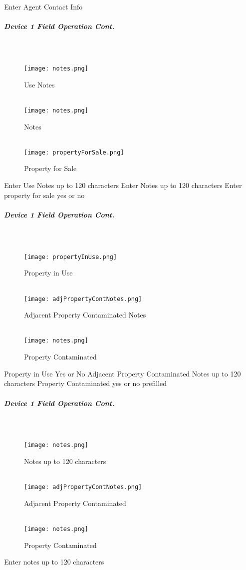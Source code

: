 \documentclass[class=article , crop=false, titlepage, twoside, multi={itemize, figure, verbatim}, float=false]{standalone}
\begin{document}
\noindent Enter Agent Contact Info
\clearpage
\subparagraph*{Device 1 Field Operation Cont.}
\subparagraph*{\\}
\begin{wrapfigure}{r}{0.5\textwidth}
\centering
\texttt{[image: notes.png]}
\caption {Use Notes}
\vspace{.2in}
\HRule \\[.4cm] %
\vspace{.2in}
\texttt{[image: notes.png]}
\caption{Notes}
\vspace{.2in}
\HRule \\[.4cm] %
\vspace{.2in}
\texttt{[image: propertyForSale.png]}
\caption{Property for Sale}
\end{wrapfigure}
Enter  Use Notes up to 120 characters
\vspace{2in}
\noindent Enter Notes up to 120 characters
\vspace{2in}
\noindent Enter property for sale yes or no
\clearpage
\subparagraph*{Device 1 Field Operation Cont.}
\subparagraph*{\\}
\begin{wrapfigure}{r}{0.5\textwidth}
\centering
\texttt{[image: propertyInUse.png]}
\caption {Property in Use}
\vspace{.2in}
\HRule \\[.4cm] %
\vspace{.2in}
\texttt{[image: adjPropertyContNotes.png]}
\caption{Adjacent Property Contaminated Notes}
\vspace{.2in}
\HRule \\[.4cm] %
\vspace{.2in}
\texttt{[image: notes.png]}
\caption{Property Contaminated}
\end{wrapfigure}
Property in Use Yes or No
\vspace{2in}
\noindent Adjacent Property Contaminated Notes up to 120 characters
\vspace{2in}
\noindent Property Contaminated yes or no prefilled
\clearpage
\subparagraph*{Device 1 Field Operation Cont.}
\subparagraph*{\\}
\begin{wrapfigure}{r}{0.5\textwidth}
\centering
\texttt{[image: notes.png]}
\caption {Notes up to 120 characters}
\vspace{.2in}
\HRule \\[.4cm] %
\vspace{.2in}
\texttt{[image: adjPropertyContNotes.png]}
\caption{Adjacent Property Contaminated}
\vspace{.2in}
\HRule \\[.4cm] %
\vspace{.2in}
\texttt{[image: notes.png]}
\caption{Property Contaminated}
\end{wrapfigure}
Enter notes up to 120 characters
\vspace{2in}
\end{document}
